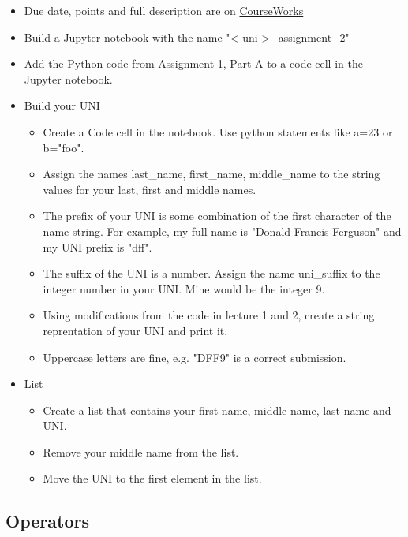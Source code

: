 \documentclass[11pt]{article}
\providecommand{\tightlist}{%
      \setlength{\itemsep}{0pt}\setlength{\parskip}{0pt}}
\begin{document}
\begin{itemize}
\item
  Due date, points and full description are on
  \href{https://courseworks2.columbia.edu/courses/53496/assignments/134478}{CourseWorks}
\item
  Build a Jupyter notebook with the name "\textless{} uni
  \textgreater{}\_assignment\_2"
\item
  Add the Python code from Assignment 1, Part A to a code cell in the
  Jupyter notebook.
\item
  Build your UNI

  \begin{itemize}
  \tightlist
  \item
    Create a Code cell in the notebook. Use python statements like a=23
    or b="foo".
  \item
    Assign the names last\_name, first\_name, middle\_name to the string
    values for your last, first and middle names.
  \item
    The prefix of your UNI is some combination of the first character of
    the name string. For example, my full name is "Donald Francis
    Ferguson" and my UNI prefix is "dff".
  \item
    The suffix of the UNI is a number. Assign the name uni\_suffix to
    the integer number in your UNI. Mine would be the integer 9.
  \item
    Using modifications from the code in lecture 1 and 2, create a
    string reprentation of your UNI and print it.
  \item
    Uppercase letters are fine, e.g. "DFF9" is a correct submission.
  \end{itemize}
\item
  List

  \begin{itemize}
  \tightlist
  \item
    Create a list that contains your first name, middle name, last name
    and UNI.
  \item
    Remove your middle name from the list.
  \item
    Move the UNI to the first element in the list.
  \end{itemize}
\end{itemize}

    \subsection{Operators}\label{operators}
\end{document}
